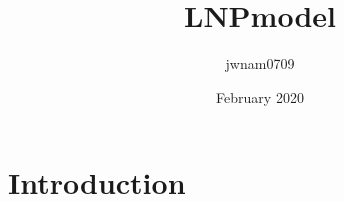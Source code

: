 \documentclass{article}
\title{LNPmodel}
\author{jwnam0709 }
\date{February 2020}
\begin{document}
\maketitle

\section{Introduction}
\end{document}
